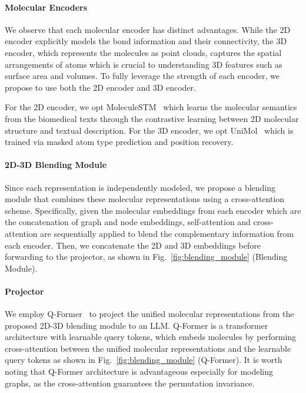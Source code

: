 \paragraph{Molecular Encoders}
We observe that each molecular encoder has distinct advantages. While the 2D encoder explicitly models the bond information and their connectivity, the 3D encoder, which represents the molecules as point clouds, captures the spatial arrangements of atoms which is crucial to understanding 3D features such as surface area and volumes. To fully leverage the strength of each encoder, we propose to use both the 2D encoder and 3D encoder. 

For the 2D encoder, we opt MoleculeSTM~\cite{liu2023moleculestm} which learns the molecular semantics from the biomedical texts through the contrastive learning between 2D molecular structure and textual description. For the 3D encoder, we opt UniMol~\cite{zhou2023unimol} which is trained via masked atom type prediction and position recovery. 

\vspace{-0.045in}
\paragraph{2D-3D Blending Module}
Since each representation is independently modeled, we propose a blending module that combines these molecular representations using a cross-attention scheme. Specifically, given the molecular embeddings from each encoder which are the concatenation of graph and node embeddings, self-attention and cross-attention are sequentially applied to blend the complementary information from each encoder. Then, we concatenate the 2D and 3D embeddings before forwarding to the projector, as shown in Fig.~\ref{fig:blending_module} (Blending Module).

\vspace{-0.05in}
\paragraph{Projector}
We employ Q-Former~\cite{li2023BLIP2,li2024molm} to project the unified molecular representations from the proposed 2D-3D blending module to an LLM. Q-Former is a transformer architecture with learnable query tokens, which embeds molecules by performing cross-attention between the unified molecular representations and the learnable query tokens as shown in Fig.~\ref{fig:blending_module} (Q-Former). It is worth noting that Q-Former architecture is advantageous especially for modeling graphs, as the cross-attention guarantees the permutation invariance. 

